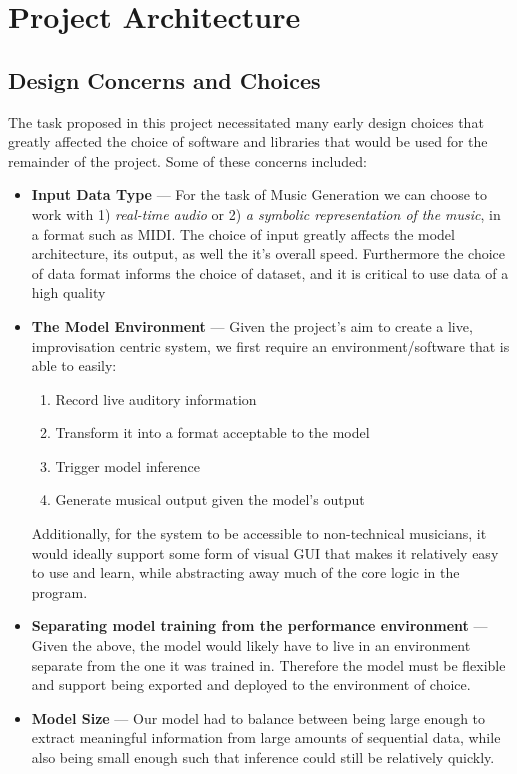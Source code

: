 \documentclass[../main.tex]{subfiles}
\begin{document}
\newpage

\chapter{Project Architecture}

\section{Design Concerns and Choices}
The task proposed in this project necessitated many early design choices that greatly affected the choice of software and libraries that would be used for the remainder of the project. Some of these concerns included:

\begin{itemize}

    \item\textbf{Input Data Type} — For the task of Music Generation we can choose to work with 1) \textit{real-time audio} or 2) \textit{a symbolic representation of the music}, in a format such as MIDI. The choice of input greatly affects the model architecture, its output, as well the it's overall speed. Furthermore the choice of data format informs the choice of dataset, and it is critical to use data of a high quality
    
    \item \textbf{The Model Environment} — Given the project's aim to create a live, improvisation centric system, we first require an environment/software that is able to easily:
    
    \begin{enumerate}
        \item Record live auditory information
        \item Transform it into a format acceptable to the model
        \item Trigger model inference
        \item Generate musical output given the model's output
    \end{enumerate}
    
    Additionally, for the system to be accessible to non-technical musicians, it would ideally support some form of visual GUI that makes it relatively easy to use and learn, while abstracting away much of the core logic in the program.
    
    
    \item \textbf{Separating model training from the performance environment} — Given the above, the model would likely have to live in an environment separate from the one it was trained in. Therefore the model must be flexible and support being exported and deployed to the environment of choice. 

    \item \textbf{Model Size} — Our model had to balance between being large enough to extract meaningful information from large amounts of sequential data, while also being small enough such that inference could still be relatively quickly. 
    
\end{itemize}
\end{document}
